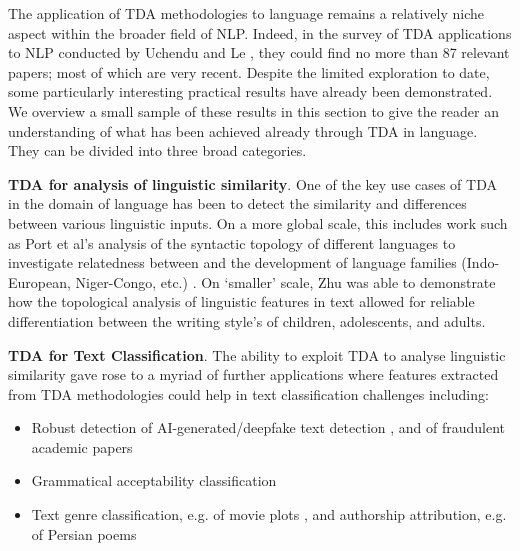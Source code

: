 \documentclass[12pt,twoside]{report}
\begin{document}
The application of TDA methodologies to language remains a relatively niche aspect within the broader field of NLP. Indeed, in the survey of TDA applications to NLP conducted by Uchendu and Le \cite{uchendu2024unveilingtopologicalstructurestext}, they could find no more than 87 relevant papers; most of which are very recent. Despite the limited exploration to date, some particularly interesting practical results have already been demonstrated. We overview a small sample of these results in this section to give the reader an understanding of what has been achieved already through TDA in language. They can be divided into three broad categories. \newline \par

\textbf{TDA for analysis of linguistic similarity}. One of the key use cases of TDA in the domain of language has been to detect the similarity and differences between various linguistic inputs. On a more global scale, this includes work such as Port et al's analysis of the syntactic topology of different languages to investigate relatedness between and the development of language families (Indo-European, Niger-Congo, etc.) \cite{port2018, port2022}. On `smaller' scale, Zhu \cite{zhu2013} was able to demonstrate how the topological analysis of linguistic features in text allowed for reliable differentiation between the writing style's of children, adolescents, and adults. \newline \par

\textbf{TDA for Text Classification}. The ability to exploit TDA to analyse linguistic similarity gave rose to a myriad of further applications where features extracted from TDA methodologies could help in text classification challenges including:
\begin{itemize}[itemsep=0pt]
    \item Robust detection of AI-generated/deepfake text detection \cite{uchendu2024topformertopologyawareauthorshipattribution, tulchinskii2023intrinsicdimensionestimationrobust, kushnareva2024aigeneratedtextboundarydetection}, and of fraudulent academic papers \cite{tymochko2021}
    \item Grammatical acceptability classification \cite{cherniavskii-etal-2022-acceptability}
    \item Text genre classification, e.g. of movie plots \cite{doshi2018}, and authorship attribution, e.g. of Persian poems \cite{elyasi2019introductionnewtextclassification}
\end{itemize}
\end{document}
